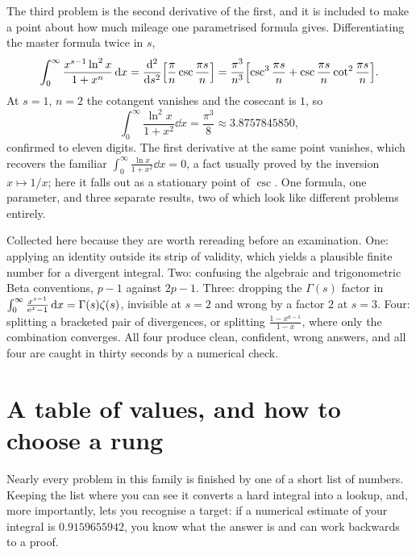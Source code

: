 The third problem is the second derivative of the first, and it is included to make a point about how much mileage one parametrised formula gives. Differentiating the master formula twice in $s$,
\[\int_0^{\infty}\frac{x^{s-1}\ln^{2}x}{1+x^{n}}\,\mathrm{d} x=\frac{\mathrm{d}^{2}}{\mathrm{d}s^{2}}\Bigl[\frac{\pi}{n}\csc\frac{\pi s}{n}\Bigr]
=\frac{\pi^{3}}{n^{3}}\Bigl[\csc^{3}\frac{\pi s}{n}+\csc\frac{\pi s}{n}\cot^{2}\frac{\pi s}{n}\Bigr].\]
At $s=1$, $n=2$ the cotangent vanishes and the cosecant is $1$, so
\[\int_0^{\infty}\frac{\ln^{2}x}{1+x^{2}}\dd x=\frac{\pi^{3}}{8}\approx3.8757845850,\]
confirmed to eleven digits. The first derivative at the same point vanishes, which recovers the familiar $\int_0^{\infty}\frac{\ln x}{1+x^{2}}\dd x=0$, a fact usually proved by the inversion $x\mapsto1/x$; here it falls out as a stationary point of $\csc$. One formula, one parameter, and three separate results, two of which look like different problems entirely.

\begin{keynote}
Collected here because they are worth rereading before an examination. One: applying an identity outside its strip of validity, which yields a plausible finite number for a divergent integral. Two: confusing the algebraic and trigonometric Beta conventions, $p-1$ against $2p-1$. Three: dropping the $\Gamma(s)$ factor in $\int_0^{\infty}\frac{x^{s-1}}{\mathrm{e}^{x}-1}\,\mathrm{d} x=\Gamma(s)\zeta(s)$, invisible at $s=2$ and wrong by a factor $2$ at $s=3$. Four: splitting a bracketed pair of divergences, or splitting $\frac{1-x^{a-1}}{1-x}$, where only the combination converges. All four produce clean, confident, wrong answers, and all four are caught in thirty seconds by a numerical check.
\end{keynote}

\section{A table of values, and how to choose a rung}

Nearly every problem in this family is finished by one of a short list of numbers. Keeping the list where you can see it converts a hard integral into a lookup, and, more importantly, lets you recognise a target: if a numerical estimate of your integral is $0.9159655942$, you know what the answer is and can work backwards to a proof.

